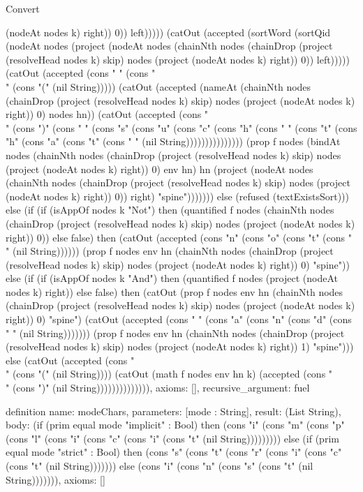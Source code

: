 \begin{lexlean}{Convert}
\begin{semanticmodule}
{(nodeAt nodes k) right)) 0)) left))))) (catOut (accepted (sortWord (sortQid (nodeAt nodes (project (nodeAt nodes (chainNth nodes (chainDrop (project (resolveHead nodes k) skip) nodes (project (nodeAt nodes k) right)) 0)) left))))) (catOut (accepted (cons " " (cons "\\" (cons "(" (nil String))))) (catOut (accepted (nameAt (chainNth nodes (chainDrop (project (resolveHead nodes k) skip) nodes (project (nodeAt nodes k) right)) 0) nodes hn)) (catOut (accepted (cons "\\" (cons ")" (cons " " (cons "s" (cons "u" (cons "c" (cons "h" (cons " " (cons "t" (cons "h" (cons "a" (cons "t" (cons " " (nil String))))))))))))))) (prop f nodes (bindAt nodes (chainNth nodes (chainDrop (project (resolveHead nodes k) skip) nodes (project (nodeAt nodes k) right)) 0) env hn) hn (project (nodeAt nodes (chainNth nodes (chainDrop (project (resolveHead nodes k) skip) nodes (project (nodeAt nodes k) right)) 0)) right) "spine"))))))) else (refused (textExistsSort))) else (if (if (isAppOf nodes k "Not") then (quantified f nodes (chainNth nodes (chainDrop (project (resolveHead nodes k) skip) nodes (project (nodeAt nodes k) right)) 0)) else false) then (catOut (accepted (cons "n" (cons "o" (cons "t" (cons " " (nil String)))))) (prop f nodes env hn (chainNth nodes (chainDrop (project (resolveHead nodes k) skip) nodes (project (nodeAt nodes k) right)) 0) "spine")) else (if (if (isAppOf nodes k "And") then (quantified f nodes (project (nodeAt nodes k) right)) else false) then (catOut (prop f nodes env hn (chainNth nodes (chainDrop (project (resolveHead nodes k) skip) nodes (project (nodeAt nodes k) right)) 0) "spine") (catOut (accepted (cons " " (cons "a" (cons "n" (cons "d" (cons " " (nil String))))))) (prop f nodes env hn (chainNth nodes (chainDrop (project (resolveHead nodes k) skip) nodes (project (nodeAt nodes k) right)) 1) "spine"))) else (catOut (accepted (cons "\\" (cons "(" (nil String)))) (catOut (math f nodes env hn k) (accepted (cons "\\" (cons ")" (nil String)))))))))))))),
  axioms: [],
  recursive_argument: fuel
}

definition{
  name: modeChars,
  parameters: [mode : String],
  result: (List String),
  body: (if (prim equal mode "implicit" : Bool) then (cons "i" (cons "m" (cons "p" (cons "l" (cons "i" (cons "c" (cons "i" (cons "t" (nil String))))))))) else (if (prim equal mode "strict" : Bool) then (cons "s" (cons "t" (cons "r" (cons "i" (cons "c" (cons "t" (nil String))))))) else (cons "i" (cons "n" (cons "s" (cons "t" (nil String))))))),
  axioms: []
}


\end{semanticmodule}
\end{lexlean}
